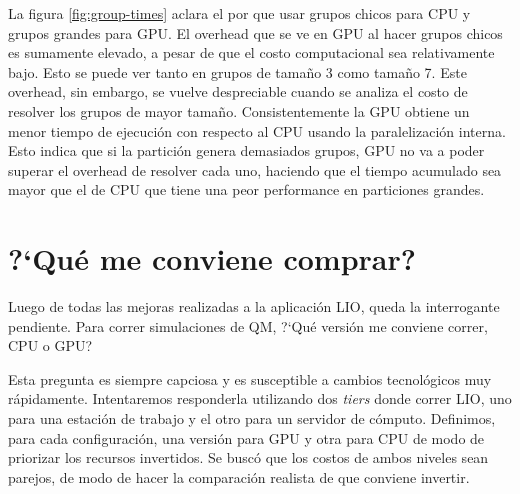 La figura \ref{fig:group-times} aclara el por que usar grupos chicos para CPU y grupos grandes
para GPU. El overhead que se ve en GPU al hacer grupos chicos es sumamente elevado, a pesar de que
el costo computacional sea relativamente bajo. Esto se puede ver tanto en grupos de tama\~no
3 como tama\~no 7. Este overhead, sin embargo, se vuelve despreciable cuando se analiza el costo
de resolver los grupos de mayor tama\~no. Consistentemente la GPU obtiene un menor tiempo de ejecuci\'on
con respecto al CPU usando la paralelizaci\'on interna. Esto indica que si la partici\'on genera demasiados
grupos, GPU no va a poder superar el overhead de resolver cada uno, haciendo que el tiempo acumulado sea
mayor que el de CPU que tiene una peor performance en particiones grandes.

\section{?`Qu\'e me conviene comprar?}
Luego de todas las mejoras realizadas a la aplicaci\'on LIO, queda la interrogante pendiente. Para
correr simulaciones de QM, ?`Qu\'e versi\'on me conviene correr, CPU o GPU?

Esta pregunta es siempre capciosa y es susceptible a cambios tecnol\'ogicos muy r\'apidamente. Intentaremos
responderla utilizando dos \textit{tiers} donde correr LIO, uno para una estaci\'on de trabajo
y el otro para un servidor de c\'omputo. Definimos, para cada configuraci\'on, una versi\'on para GPU y otra
para CPU de modo de priorizar los recursos invertidos. Se busc\'o que los costos de ambos niveles
sean parejos, de modo de hacer la comparaci\'on realista de que conviene invertir.


